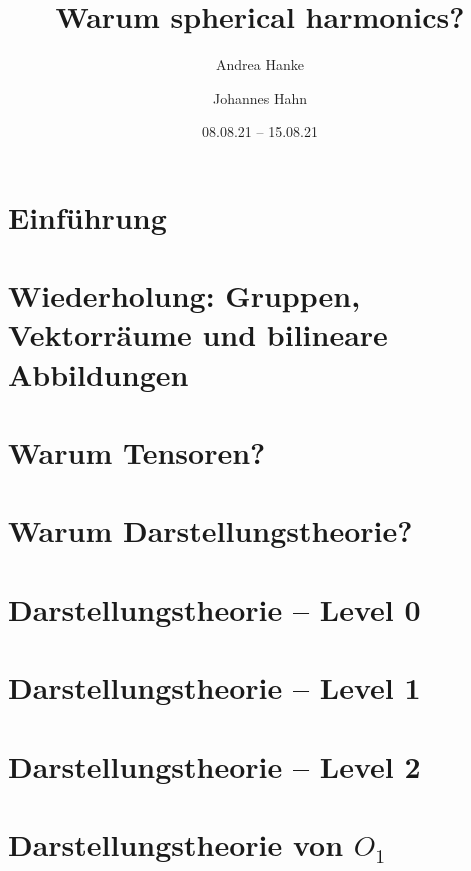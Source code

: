 \documentclass[fontsize=11pt,fleqn,a4paper]{scrartcl}
\author{Andrea Hanke \and Johannes Hahn}
\title{Warum spherical harmonics?}
\date{08.08.21 -- 15.08.21}
\begin{document}
\maketitle

\tableofcontents
\pagebreak
\setcounter{section}{-1}
\section{Einführung}

\section{Wiederholung: Gruppen, Vektorräume und bilineare Abbildungen}



\pagebreak

\section{Warum Tensoren?}



\pagebreak
\section{Warum Darstellungstheorie?}




\pagebreak
\section{Darstellungstheorie -- Level 0}




\pagebreak
\section{Darstellungstheorie -- Level 1}




\pagebreak
\section{Darstellungstheorie -- Level 2}


\pagebreak
\section{Darstellungstheorie \texorpdfstring{von $O_1$}{der Isometriegruppe der reellen Geraden}}

\end{document}
